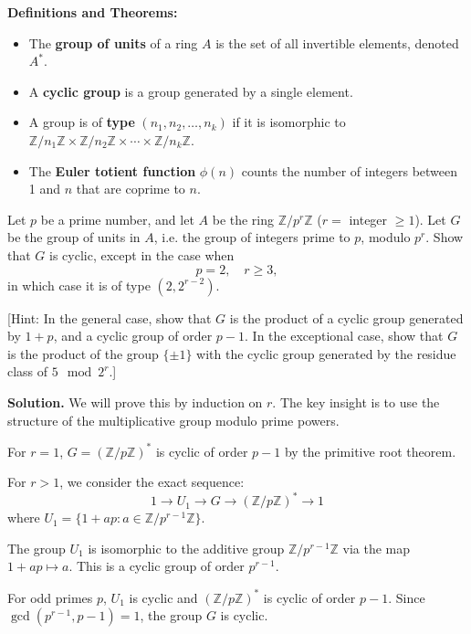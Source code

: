 \noindent\textbf{Definitions and Theorems:}
\begin{itemize}
\item The \textbf{group of units} of a ring $A$ is the set of all invertible elements, denoted $A^*$.
\item A \textbf{cyclic group} is a group generated by a single element.
\item A group is of \textbf{type} $(n_1, n_2, \ldots, n_k)$ if it is isomorphic to $\mathbb{Z}/n_1\mathbb{Z} \times \mathbb{Z}/n_2\mathbb{Z} \times \cdots \times \mathbb{Z}/n_k\mathbb{Z}$.
\item The \textbf{Euler totient function} $\phi(n)$ counts the number of integers between 1 and $n$ that are coprime to $n$.
\end{itemize}

\begin{problembox}
Let $p$ be a prime number, and let $A$ be the ring $\mathbb{Z}/p^r\mathbb{Z}$ ($r =$ integer $\geq 1$). Let $G$ be the group of units in $A$, i.e. the group of integers prime to $p$, modulo $p^r$. Show that $G$ is cyclic, except in the case when
\[ p = 2, \quad r \geq 3, \]
in which case it is of type $(2, 2^{r-2})$. 

[Hint: In the general case, show that $G$ is the product of a cyclic group generated by $1 + p$, and a cyclic group of order $p - 1$. In the exceptional case, show that $G$ is the product of the group $\{\pm 1\}$ with the cyclic group generated by the residue class of $5 \mod 2^r$.]
\end{problembox}

\noindent\textbf{Solution.}
We will prove this by induction on $r$. The key insight is to use the structure of the multiplicative group modulo prime powers.

For $r = 1$, $G = (\mathbb{Z}/p\mathbb{Z})^*$ is cyclic of order $p-1$ by the primitive root theorem.

For $r > 1$, we consider the exact sequence:
\[ 1 \rightarrow U_1 \rightarrow G \rightarrow (\mathbb{Z}/p\mathbb{Z})^* \rightarrow 1 \]
where $U_1 = \{1 + ap : a \in \mathbb{Z}/p^{r-1}\mathbb{Z}\}$.

The group $U_1$ is isomorphic to the additive group $\mathbb{Z}/p^{r-1}\mathbb{Z}$ via the map $1 + ap \mapsto a$. This is a cyclic group of order $p^{r-1}$.

For odd primes $p$, $U_1$ is cyclic and $(\mathbb{Z}/p\mathbb{Z})^*$ is cyclic of order $p-1$. Since $\gcd(p^{r-1}, p-1) = 1$, the group $G$ is cyclic.

